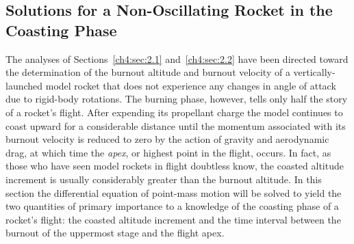 \subsection{Solutions for a Non-Oscillating Rocket in the Coasting Phase}\label{ch4:sec:2.3}

The analyses of Sections~\ref{ch4:sec:2.1} and~\ref{ch4:sec:2.2} have been directed toward the
determination of the burnout altitude and burnout velocity of a vertically-launched model rocket that does
not experience any changes in angle of attack due to rigid-body rotations. The burning phase, however, tells
only half the story of a rocket's flight. After expending its propellant charge the model continues to coast
upward for a considerable distance until the momentum associated with its burnout velocity is reduced to
zero by the action of gravity and aerodynamic drag, at which time the \emph{apex}, or highest point in the
flight, occurs. In fact, as those who have seen model rockets in flight doubtless know, the coasted altitude
increment is usually considerably greater than the burnout altitude. In this section the differential
equation of point-mass motion will be solved to yield the two quantities of primary importance to a
knowledge of the coasting phase of a rocket's flight: the coasted altitude increment and the time interval
between the burnout of the uppermost stage and the flight apex.

